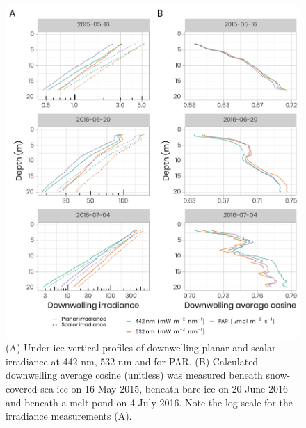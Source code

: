 \documentclass[12pt,a4paper]{scrartcl}
\begin{document}
\begin{figure}[h]
	\centering
	\includegraphics[scale = 1]{../../../graphs/fig06.pdf}
	\caption{(A) Under-ice vertical profiles of downwelling planar and scalar irradiance at 442 nm, 532 nm and for PAR. (B) Calculated downwelling average cosine (unitless) was measured beneath snow-covered sea ice on 16 May 2015, beneath bare ice on 20 June 2016 and beneath a melt pond on 4 July 2016. Note the log scale for the irradiance measurements (A).}
\end{figure}

\clearpage
\newpage
\end{document}
